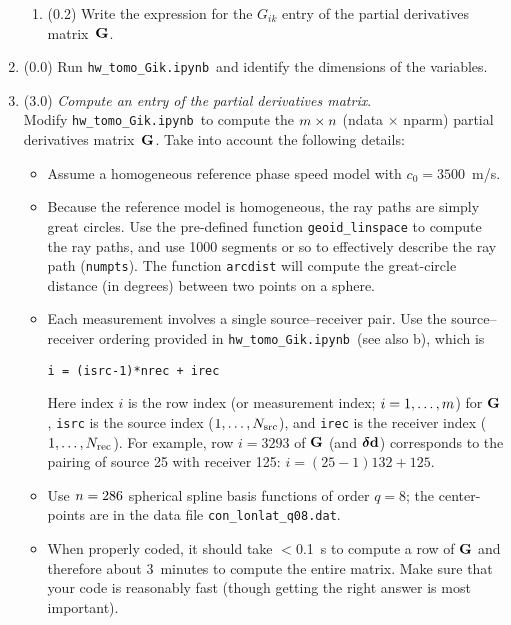\documentclass[11pt,titlepage,fleqn]{article}
\newcommand{\tfileGik}{{\tt hw\_tomo\_Gik.ipynb}}
\begin{document}
\begin{enumerate}
\begin{enumerate}
\item (0.2) Write the expression for the $G_{ik}$ entry of the partial derivatives matrix~$\mbox{${\bf G}$}$.
\end{enumerate}


\item (0.0) Run \tfileGik\ and identify the dimensions of the variables.


\item (3.0) {\em Compute an entry of the partial derivatives matrix}. \\
Modify \tfileGik\ to compute the $m \times n$ (ndata $\times$ nparm) partial derivatives matrix~$\mbox{${\bf G}$}$.
Take into account the following details:
%
\begin{itemize}
\item Assume a homogeneous reference phase speed model with $c_0 = 3500$~m/s.

\item Because the reference model is homogeneous, the ray paths are simply great circles.  Use the pre-defined function \verb+geoid_linspace+ to compute the ray paths, and use 1000 segments or so to effectively describe the ray path (\verb+numpts+). The function \verb+arcdist+ will compute the great-circle distance (in degrees) between two points on a sphere.

\item Each measurement involves a single source--receiver pair. Use the source--receiver ordering provided in \tfileGik\ (see also b), which is
%
\begin{verbatim}
i = (isrc-1)*nrec + irec
\end{verbatim}
%
Here index $i$ is the row index (or measurement index; $i = 1,\ldots,m$) for $\mbox{${\bf G}$}$, \verb+isrc+ is the source index ($1, \ldots, N_{\rm src}$), and \verb+irec+ is the receiver index ($1, \ldots, N_{\rm rec}$). For example, row $i=3293$ of $\mbox{${\bf G}$}$ (and $\mbox{\boldmath $\bf \delta$}\mbox{${\bf d}$}$) corresponds to the pairing of source 25 with receiver 125: $i=(25-1)132 + 125$.

\item Use $n=286$ spherical spline basis functions of order $q=8$; the center-points are in the data file \verb+con_lonlat_q08.dat+.

\item When properly coded, it should take $<$0.1~s to compute a row of $\mbox{${\bf G}$}$ and therefore about 3~minutes to compute the entire matrix. Make sure that your code is reasonably fast (though getting the right answer is most important).


\end{itemize}
\end{enumerate}
\end{document}
